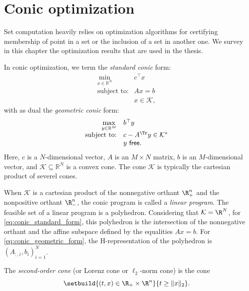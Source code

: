 \documentclass[11pt,twoside,a4paper,openright]{uclouvain-thesis}
\begin{document}
\section{Conic optimization}

Set computation heavily relies on optimization algorithms for certifying membership of point in a set or the inclusion of a set in another one.
We survey in this chapter the optimization results that are used in the thesis.

In conic optimization, we term the \textit{standard conic} form:
\begin{equation}\label{eq:conic_standard_form}
    \begin{array}{rl}
        \min\limits_{x\in\mathbb{R}^N} & c^\top x\\
        \text{subject to:} & Ax = b\\
                           & x \in \mathcal{K},
    \end{array}
\end{equation}
with as dual the \textit{geometric conic} form:
\begin{equation}\label{eq:conic_geometric_form}
    \begin{array}{rl}
        \max\limits_{y\in\mathbb{R}^M} & b^\top y\\
        \text{subject to:} & c - A^\Tr y \in \mathcal{K}^*\\
                           & y\ \mathsf{free}.
    \end{array}
\end{equation}
Here, $c$ is a $N$-dimensional vector, $A$ is an $M\times N$ matrix, $b$ is an $M$-dimensional vector, and $\mathcal{K} \subseteq \mathbb{R}^N$ is a convex cone.
The cone $\mathcal{K}$ is typically the cartesian product of severel cones.

When $\mathcal{K}$ is a cartesian product of the nonnegative orthant $\R^n_+$ and the nonpositive orthant $\R^n_-$,
the conic program is called a \emph{linear program}.
The feasible set of a linear program is a polyhedron.
Considering that $\mathcal{K} = \R^N$,
for \eqref{eq:conic_standard_form}, this polyhedron is the intersection of the nonnegative orthant and the affine subspace defined by the equalities $Ax = b$.
For \eqref{eq:conic_geometric_form}, the H-representation of the polyhedron is $(A_{:,i}, b_i)_{i=1}^N$.

\begin{mydef}
  The \emph{second-order cone} (or Lorenz cone or $\ell_2$-norm cone) is the cone
  \[
    \setbuild{(t,x) \in \R_+ \times \R^n}{t \ge \lVert x \rVert_2}.
  \]
\end{mydef}
\end{document}
